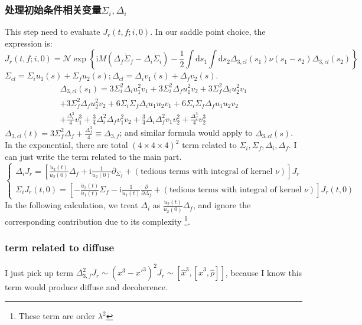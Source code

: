 \documentclass{article}
\newcommand{\D}[0]{\mathrm{d}}
\renewcommand{\I}[0]{\mathrm{i}}
\renewcommand{\exp}[1]{\operatorname{exp}\left\{#1\right\}}
\begin{document}
\subsubsection{处理初始条件相关变量$\Sigma_i,\Delta_i$}
This step need to evaluate $J_r(t,f;i,0)$. In our saddle point choice, the expression is:
\begin{equation}
    J_r(t,f;i,0)=\mathcal{N}\exp{\I M(\Delta_f\dot{\Sigma}_f-\Delta_i\dot{\Sigma}_i)-\frac{1}{2}\int\D s_1\int\D s_2\Delta_{3,cl}(s_1)\nu(s_1-s_2)\Delta_{3,cl}(s_2)}
\end{equation}
$\Sigma_{cl}=\Sigma_i u_1(s)+\Sigma_f u_2(s);\Delta_{cl}=\Delta_i v_1(s)+\Delta_f v_2(s)$.
\begin{equation}
    \begin{split}
        \Delta_{3,cl}(s_1) = 3\Sigma_i^2 \Delta_i u_1^2 v_1 + 3\Sigma_i^2 \Delta_f u_1^2 v_2
+3\Sigma_f^2 \Delta_i u_2^2 v_1 \\+ 3\Sigma_f^2 \Delta_f u_2^2 v_2
+6\Sigma_i \Sigma_f \Delta_i u_1 u_2 v_1 + 6\Sigma_i \Sigma_f \Delta_f u_1 u_2 v_2\\
+ \frac{\Delta_i^3}{4} v_1^3 + \frac{3}{4} \Delta_i^2 \Delta_f v_1^2 v_2 + \frac{3}{4} \Delta_i \Delta_f^2 v_1 v_2^2 + \frac{\Delta_f^3}{4} v_2^3
    \end{split}
\end{equation}
$\Delta_{3,cl}(t)=3\Sigma_f^2\Delta_f+\frac{\Delta_f^3}{4}\equiv \Delta_{3,f}$; and similar formula would apply to $\Delta_{3,cl}(s)$. 
In the exponential, there are total $(4\times 4\times4)^2$ term related to $\Sigma_i,\Sigma_f,\Delta_i,\Delta_f$. I can just write the term related to the main part.
\begin{equation}
    \begin{cases}
        \Delta_iJ_r=\left[\frac{\dot{u}_2(t)}{\dot{u}_2(0)}\Delta_f+\mathrm{i}\frac{1}{\dot{u}_2(0)}\partial_{\Sigma_f}+(\text{tedious terms with integral of kernel }\nu)\right]J_r\\
         \Sigma_i J_r(t, 0) = \left[ -\frac{\dot{u}_2(t)}{\dot{u}_1(t)} \Sigma_f-\I\frac{1}{\dot{u}_1(t)}\frac{\partial}{\partial\Delta_f} +(\text{tedious terms with integral of kernel }\nu)\right]J_r(t,0)
    \end{cases}
\end{equation}
In the following calculation, we treat $\Delta_i$ as $\frac{\dot{u}_2(t)}{\dot{u}_2(0)}\Delta_f$, and ignore the corresponding contribution due to its complexity \footnote{These term are order $\lambda^2$}.
\subsubsection{term related to diffuse}
I just pick up term $\Delta_{3,f}^2J_r\sim (x^3-x'^3)^2J_r\sim[\hat{x}^3,[\hat{x}^3,\hat{\rho}]]$, because I know this term would produce diffuse and decoherence. 
\end{document}
